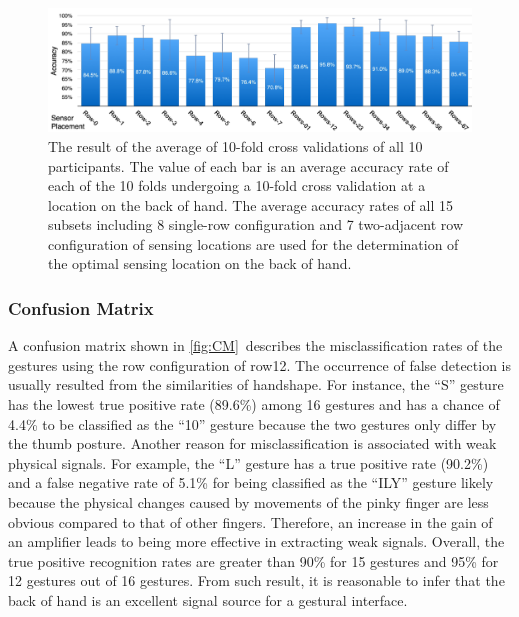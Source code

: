 \documentclass{sigchi}
\begin{document}
\begin{figure}
 \begin{center}
  \includegraphics[width=2\columnwidth]{figures/10FCV_16.pdf}
  \caption{
    The result of the average of 10-fold cross validations of all 10 participants. The value of each bar is an average accuracy rate of each of the 10 folds undergoing a 10-fold cross validation at a location on the back of hand. The average accuracy rates of all 15 subsets including 8 single-row configuration and 7 two-adjacent row configuration of sensing locations are used for the determination of the optimal sensing location on the back of hand.
  }
  \label{fig:accuracy16Gs}
  \end{center}
\end{figure}

\subsubsection{Confusion Matrix}

A confusion matrix shown in \autoref{fig:CM}\ describes the misclassification rates of the gestures using the row configuration of row12.
The occurrence of false detection is usually resulted from the similarities of handshape.
For instance, the ``S'' gesture has the lowest true positive rate (89.6\%) among 16 gestures and has a chance of 4.4\% to be classified as the ``10'' gesture because the two gestures only differ by the thumb posture.
Another reason for misclassification is associated with weak physical signals.
For example, the ``L'' gesture has a true positive rate (90.2\%) and a false negative rate of 5.1\% for being classified as the ``ILY'' gesture likely because the  physical changes caused by movements of the pinky finger are less obvious compared to that of other fingers. Therefore, an increase in the gain of an amplifier leads to being more effective in extracting weak signals.
Overall, the true positive recognition rates are greater than 90\% for 15 gestures and 95\% for 12 gestures out of 16 gestures. From such result, it is reasonable to infer that the back of hand is an excellent signal source for a gestural interface.
\end{document}
